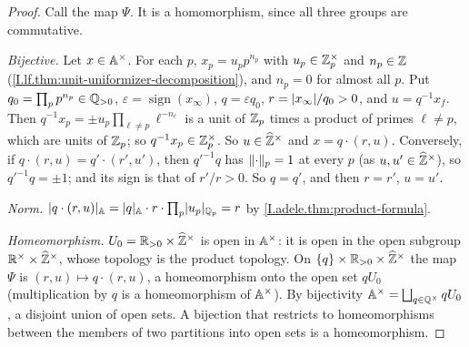 \begin{theorem}
\end{theorem}
\begin{proof}
Call the map $\Psi$. It is a homomorphism, since all three groups are commutative.

\emph{Bijective.} Let $x\in\mathbb{A}^\times$. For each $p$, $x_p=u_pp^{n_p}$ with $u_p\in\mathbb{Z}_p^\times$ and $n_p\in\mathbb{Z}$
(\cref{I.lf.thm:unit-uniformizer-decomposition}), and $n_p=0$ for almost all $p$. Put $q_0=\prod_pp^{n_p}\in\mathbb{Q}_{>0}$,
$\varepsilon=\operatorname{sign}(x_\infty)$, $q=\varepsilon q_0$, $r=\lvert x_\infty\rvert/q_0>0$, and $u=q^{-1}x_f$. Then
$q^{-1}x_p=\pm u_p\prod_{\ell\neq p}\ell^{-n_\ell}$
is a unit of $\mathbb{Z}_p$ times a product of primes $\ell\neq p$, which are units of $\mathbb{Z}_p$; so $q^{-1}x_p\in\mathbb{Z}_p^\times$.
So $u\in\widehat{\mathbb{Z}}^\times$ and $x=q\cdot(r,u)$. Conversely, if $q\cdot(r,u)=q'\cdot(r',u')$, then $q'^{-1}q$ has
$\lVert\cdot\rVert_p=1$ at every $p$ (as $u,u'\in\widehat{\mathbb{Z}}^\times$), so $q'^{-1}q=\pm1$; and its sign is that of
$r'/r>0$. So $q=q'$, and then $r=r'$, $u=u'$.

\emph{Norm.} $\lvert q\cdot(r,u)\rvert_{\mathbb{A}}=\lvert q\rvert_{\mathbb{A}}\cdot r\cdot\prod_p\lvert u_p\rvert_{\mathbb{Q}_p}=r$ by \cref{I.adele.thm:product-formula}.

\emph{Homeomorphism.} $U_0=\mathbb{R}_{>0}\times\widehat{\mathbb{Z}}^\times$ is open in $\mathbb{A}^\times$: it is open in the open subgroup
$\mathbb{R}^\times\times\widehat{\mathbb{Z}}^\times$, whose topology is the product topology. On $\{q\}\times\mathbb{R}_{>0}\times\widehat{\mathbb{Z}}^\times$ the map
$\Psi$ is $(r,u)\mapsto q\cdot(r,u)$, a homeomorphism onto the open set $qU_0$ (multiplication by $q$ is a homeomorphism
of $\mathbb{A}^\times$). By bijectivity $\mathbb{A}^\times=\bigsqcup_{q\in\mathbb{Q}^\times}qU_0$, a disjoint union of open sets. A bijection
that restricts to homeomorphisms between the members of two partitions into open sets is a homeomorphism.
\end{proof}

